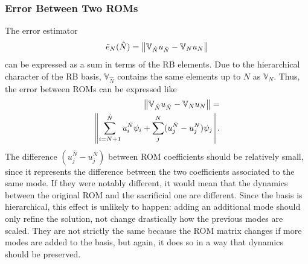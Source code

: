 \documentclass[../../thesis.tex]{subfiles}
\newcommand{\rbV}{\ensuremath{\mathbb{V}}}
\begin{document}
\subsubsection{Error Between Two ROMs}
The error estimator 
\begin{equation}
    \tilde{e}_{N}(\hat{N}) = \norm{\rbV_{\hat{N}} u_{\hat{N}} - \rbV_{N} u_{N}}
\end{equation}
can be expressed as a sum in terms of the RB elements.
Due to the hierarchical character of the RB basis, $\rbV_{\hat{N}}$ contains the same elements 
up to $N$ as $\rbV_{N}$.
Thus, the error between ROMs can be expressed like
\begin{equation}
    \begin{split}
        \norm{\rbV_{\hat{N}} u_{\hat{N}} - \rbV_{N} u_{N}} 
        = \\ 
        \norm{
        \sum_{i=N+1}^{\hat{N}} u^{\hat{N}}_{i} \psi_{i} 
        + 
        \sum_{j}^{N} (u^{\hat{N}}_{j} - u^{N}_{j}) \psi_j
        }.
    \end{split}
\end{equation}
The difference $(u^{\hat{N}}_{j} - u^{N}_{j})$ between ROM coefficients should be relatively small, 
since it represents the difference between the two coefficients associated to the same mode.
If they were notably different, 
it would mean that the dynamics between the original ROM and the sacrificial one are different.
Since the basis is hierarchical, this effect is unlikely to happen: 
adding an additional mode should only refine the solution, 
not change drastically how the previous modes are scaled.
They are not strictly the same because the ROM matrix changes if more modes are added to the basis,
but again, it does so in a way that dynamics should be preserved.
\end{document}
